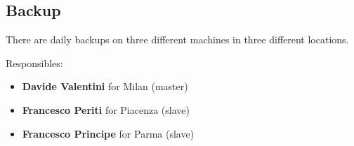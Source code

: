 \subsection{Backup}
There are daily backups on three different machines in three different locations.

Responsibles:
\begin{itemize}
	\item \textbf{Davide Valentini} for Milan (master)
	\item \textbf{Francesco Periti} for Piacenza (slave)
	\item \textbf{Francesco Principe} for Parma (slave)
\end{itemize}
